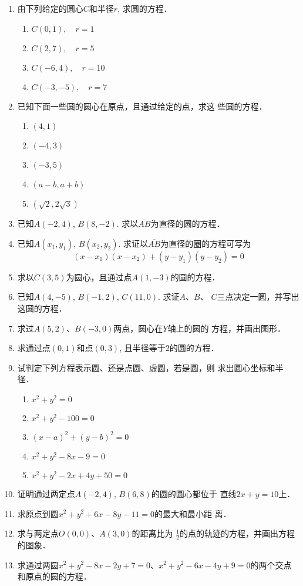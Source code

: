 \begin{ex}
\begin{enumerate}
    \item 由下列给定的圆心$C$和半径$r$, 求圆的方程．
\begin{multicols}{2}
\begin{enumerate}
    \item $C(0,1),\quad r=1$
    \item $C(2,7),\quad r=5$
    \item $C(-6,4),\quad r=10$
    \item $C(-3,-5),\quad r=7$
\end{enumerate}
\end{multicols}
    \item 已知下面一些圆的圆心在原点，且通过给定的点，求这
    些圆的方程．
\begin{multicols}{3}
\begin{enumerate}
    \item $(4,1)$
    \item $(-4,3)$
    \item $(-3,5)$
    \item $(a-b,a+b)$
    \item $(\sqrt{2},2\sqrt{3})$
\end{enumerate}
\end{multicols}

\item 已知$A(-2,4)$, $B(8,-2)$. 求以$\overline{AB}$为直径的圆的方程．
\item 已知$A(x_1,y_1)$, $B(x_2,y_2)$. 求证以$\overline{AB}$为直径的圈的方程可写为
\[(x-x_1)(x-x_2)+(y-y_1)(y-y_2)=0\]
\item 求以$C(3,5)$为圆心，且通过点$A(1,-3)$的圆的方程．
\item 已知$A(4,-5)$, $B(-1,2)$, $C(11,0)$. 求证$A$、$B$、
$C$三点决定一圆，并写出这圆的方程．
\item 求过$A(5,2)$、$B(-3,0)$两点，圆心在$Y$轴上的圆的
方程，并画出图形．
\item 求通过点$(0,1)$和点$(0,3)$, 且半径等于2的圆的方程．
\item 试判定下列方程表示圆、还是点圆、虚圆，若是圆，则
求出圆心坐标和半径．
\begin{enumerate}
\item $x^2+y^2=0$
\item $x^2+y^2-100=0$
\item $(x-a)^2+(y-b)^2=0$
\item $x^2+y^2-8x-9=0$
\item $x^2+y^2-2x+4y+50=0$
\end{enumerate}

\item 证明通过两定点$A(-2,4)$, $B(6,8)$的圆的圆心都位于
直线$2x+y=10$上．
\item 求原点到圆$x^2+y^2+6x-8y-11=0$的最大和最小距
离．
\item 求与两定点$O(0,0)$、$A(3,0)$的距离比为
$\frac{1}{2}$的点的轨迹的方程，并画出方程的图象．
\item 求通过两圆$x^2+y^2-8x-2y+7=0$、$x^2+y^2-6x-
4y+9=0$的两个交点和原点的圆的方程．
\end{enumerate}
\end{ex}

